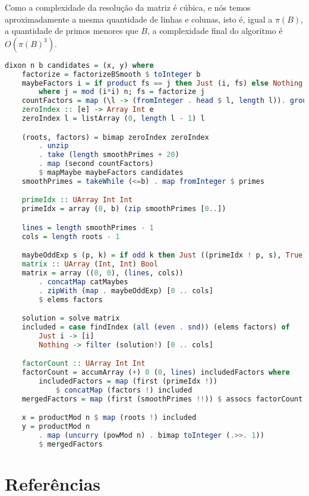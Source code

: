 \documentclass{article}
\begin{document}
Como a complexidade da resolução da matriz é cúbica, e nós temos aproximadamente a mesma quantidade de linhas e colunas, isto é, igual a $\pi(B)$, a quantidade de primos menores que $B$, a complexidade final do algoritmo é $O(\pi(B)^3)$.
\begin{minipage}{0.9\linewidth}
\begin{lstlisting}[language=haskell,caption=Fatoração de Dixon]
dixon n b candidates = (x, y) where
    factorize = factorizeBSmooth $ toInteger b
    maybeFactors i = if product fs == j then Just (i, fs) else Nothing
        where j = mod (i*i) n; fs = factorize j
    countFactors = map (\l -> (fromInteger . head $ l, length l)). group
    zeroIndex :: [e] -> Array Int e
    zeroIndex l = listArray (0, length l - 1) l

    (roots, factors) = bimap zeroIndex zeroIndex
        . unzip
        . take (length smoothPrimes + 20)
        . map (second countFactors)
        $ mapMaybe maybeFactors candidates
    smoothPrimes = takeWhile (<=b) . map fromInteger $ primes

    primeIdx :: UArray Int Int
    primeIdx = array (0, b) (zip smoothPrimes [0..])

    lines = length smoothPrimes - 1
    cols = length roots - 1

    maybeOddExp s (p, k) = if odd k then Just ((primeIdx ! p, s), True) else Nothing
    matrix :: UArray (Int, Int) Bool
    matrix = array ((0, 0), (lines, cols))
        . concatMap catMaybes
        . zipWith (map . maybeOddExp) [0 .. cols]
        $ elems factors

    solution = solve matrix
    included = case findIndex (all (even . snd)) (elems factors) of
        Just i -> [i]
        Nothing -> filter (solution!) [0 .. cols]

    factorCount :: UArray Int Int
    factorCount = accumArray (+) 0 (0, lines) includedFactors where
        includedFactors = map (first (primeIdx !))
            $ concatMap (factors !) included
    mergedFactors = map (first (smoothPrimes !!)) $ assocs factorCount

    x = productMod n $ map (roots !) included
    y = productMod n
        . map (uncurry (powMod n) . bimap toInteger (.>>. 1))
        $ mergedFactors    
\end{lstlisting}
\end{minipage}

\newpage
\section{Referências}
\printbibliography
\end{document}
